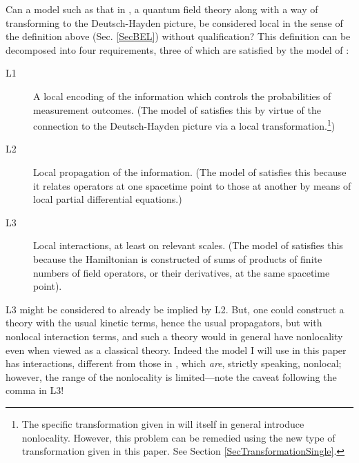 \documentclass[12pt]{article}
\begin{document}
Can a model such as that in \cite{Rubin02}, a quantum field theory along with a way of transforming to the Deutsch-Hayden picture,
be considered local in the sense of the definition above (Sec. \ref{SecBEL}) without qualification?
This definition can be decomposed into four requirements, three of which are satisfied by the model of \cite{Rubin02}:
\begin{description}
\item[L1] A local encoding of the information which controls the probabilities of measurement outcomes. (The model of \cite{Rubin02} 
satisfies this  by virtue of the connection to 
the Deutsch-Hayden picture via a local transformation.\footnote{The specific transformation given in \cite{Rubin02} will itself in general introduce nonlocality.
However, this problem can be remedied using the new type of transformation given in this paper. See Section \ref{SecTransformationSingle}.})
\item[L2] Local propagation of the  information. (The model of \cite{Rubin02} satisfies this because it relates operators at one spacetime point to those
at another by means of local partial  differential equations.) 
\item[L3] Local interactions, at least on relevant scales. (The model of \cite{Rubin02}  satisfies this because  the Hamiltonian is constructed of
sums of  products of finite numbers of field operators,
or  their derivatives, at the same spacetime point).
\end{description}
L3 might be considered to already be implied by L2.  But, one could  construct a theory  with the usual kinetic terms, hence the usual propagators, 
but with nonlocal interaction terms, and such a theory would in general have nonlocality even when viewed as a classical theory.
Indeed the model I will use in this paper has interactions, different from those in \cite{Rubin02}, which {\em are}, strictly speaking, nonlocal; however, the range of the nonlocality is
limited---note the caveat following the comma in L3!
\end{document}

